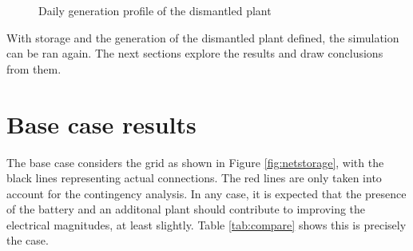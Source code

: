 \begin{figure}[!htb]\centering
{}
\caption{Daily generation profile of the dismantled plant}
    \label{fig:dism}
  \end{figure}

With storage and the generation of the dismantled plant defined, the simulation can be ran again. The next sections explore the results and draw conclusions from them.


\section{Base case results}
The base case considers the grid as shown in Figure \ref{fig:netstorage}, with the black lines representing actual connections. The red lines are only taken into account for the contingency analysis. In any case, it is expected that the presence of the battery and an additonal plant should contribute to improving the electrical magnitudes, at least slightly. Table \ref{tab:compare} shows this is precisely the case.

